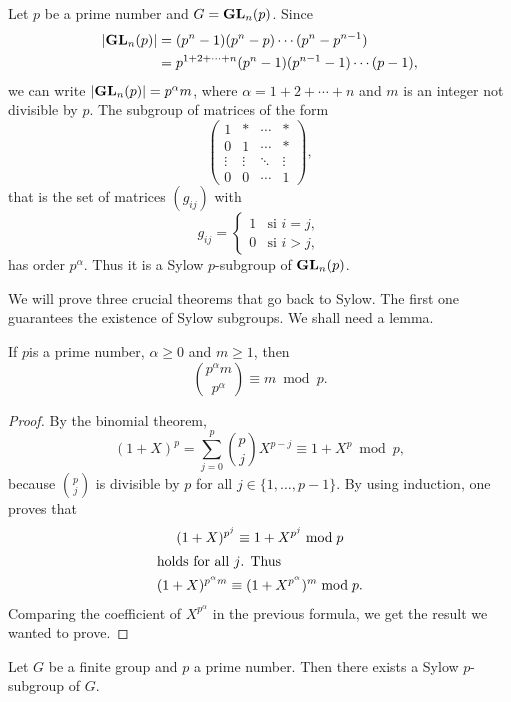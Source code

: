 \begin{example}
Let $p$ be a prime number and 
$G=\mathbf{GL}_n(p)$. Since 
\begin{align*}
|\mathbf{GL}_n(p)|&=(p^n-1)(p^n-p)\cdots (p^n-p^{n-1})\\
&=p^{1+2+\cdots+n}(p^n-1)(p^{n-1}-1)\cdots (p-1),
\end{align*}
we can write $|\mathbf{GL}_n(p)|=p^\alpha m$, where $\alpha=1+2+\cdots+n$ and $m$
is an integer not divisible by $p$. 
The subgroup of matrices of the form 
\[
\begin{pmatrix}
1 & * & \cdots & *\\
0 & 1 & \cdots & *\\
\vdots & \vdots & \ddots & \vdots\\
0 & 0 & \cdots & 1
\end{pmatrix},
\]
that is the set of matrices $(g_{ij})$ with 
\[
g_{ij}=\begin{cases}
1 & \text{si $i=j$},\\
0 & \text{si $i>j$},
\end{cases}
\]
has order $p^\alpha$. Thus it is a Sylow $p$-subgroup of 
$\mathbf{GL}_n(p)$.
\end{example}

We will prove three crucial theorems that go back to Sylow. 
The first one guarantees the existence of Sylow subgroups. 
We shall need a lemma. 

\begin{lemma}
    If $p$is a prime number, 
    $\alpha\geq0$ and $m\geq 1$, then 
    \[
        \binom{p^\alpha m}{p^\alpha}\equiv m\bmod p.
    \]
\end{lemma}

\begin{proof}
    By the binomial theorem,
        \[
        (1+X)^p=\sum_{j=0}^p\binom{p}{j}X^{p-j}\equiv 1+X^p\bmod p,
        \]
    because $\binom{p}{j}$ is divisible by $p$ for all
    $j\in\{1,\dots,p-1\}$.
    By using induction, one proves that 
        \begin{gather*}
        (1+X)^{p^j}\equiv 1+X^{p^j}\bmod p      \\
        \shortintertext{holds for all $j$. Thus}
        (1+X)^{p^\alpha m}\equiv (1+X^{p^\alpha})^m\bmod p.
        \end{gather*}
Comparing the coefficient of $X^{p^\alpha}$ in the previous
formula, we get the result we wanted to prove.
\end{proof}

\begin{theorem}
\label{thm:Sylow1}
Let $G$ be a finite group and 
$p$ a prime number. Then there exists a Sylow $p$-subgroup of $G$. 
\end{theorem}


